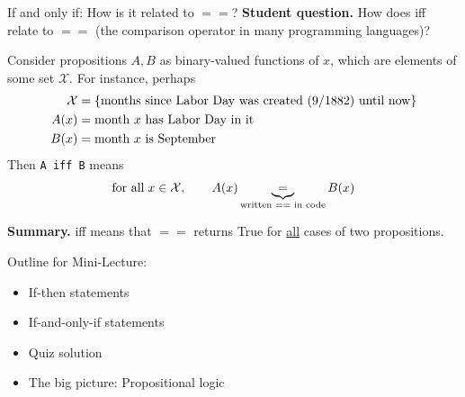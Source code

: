 \documentclass[10pt]{beamer}
\begin{document}
\begin{frame}{If and only if: How is it related to $==$?}
\colorbox{red!30}{\textbf{Student question.}} How does iff relate to $==$ (the comparison operator in many programming languages)?

\vfill \pause 

\begin{myyellowbox}[title=Case Study]
Consider propositions $A,B$ as binary-valued functions of $x$, which are elements of some set $\mathcal{X}$. For instance, perhaps 
%
\begin{align*}
\mathcal{X} &= \set{\text{months since Labor Day was created (9/1882) until now}}  \\
A(x) &= \text{month $x$ has Labor Day in it} \\
B(x) &= \text{month $x$ is September} 
\end{align*}
%
Then \texttt{A iff B} \alert{means}
\[\text{for all} \; x \in \mathcal{X}, \qquad A(x) \explaintermbrace{written == in code}{=} B(x) \]
\end{myyellowbox}

\vfill \pause 

\colorbox{green!30}{\textbf{Summary.}} iff means that $==$ returns True for \underline{all} cases of two propositions.


\end{frame}


\begin{frame}[standout]
Outline for Mini-Lecture:
\begin{itemize}
\item \textbullet \quad If-then statements
\item \textbullet \quad If-and-only-if statements
\item \alert{\textbullet \quad Quiz solution}
\item \textbullet \quad The big picture: Propositional logic
\end{itemize}

\end{frame}
\end{document}
